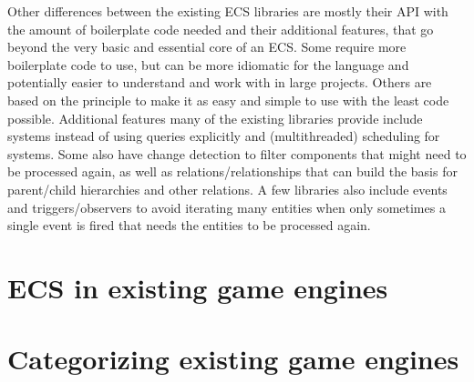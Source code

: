 Other differences between the existing ECS libraries are mostly their API with the amount of boilerplate code needed and their additional features, that go beyond the very basic and essential core of an ECS. Some require more boilerplate code to use, but can be more idiomatic for the language and potentially easier to understand and work with in large projects. Others are based on the principle to make it as easy and simple to use with the least code possible. Additional features many of the existing libraries provide include systems instead of using queries explicitly and (multithreaded) scheduling for systems. Some also have change detection to filter components that might need to be processed again, as well as relations/relationships that can build the basis for parent/child hierarchies and other relations. A few libraries also include events and triggers/observers to avoid iterating many entities when only sometimes a single event is fired that needs the entities to be processed again.

\section{ECS in existing game engines}



\section{Categorizing existing game engines}


